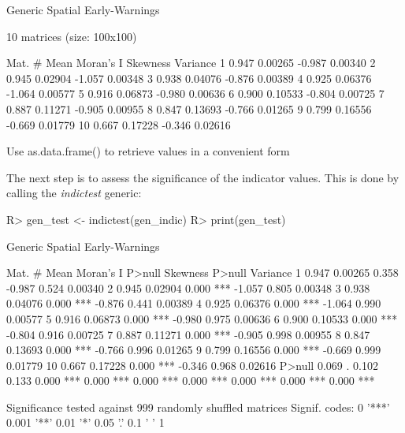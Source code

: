 \documentclass{article}
\begin{document}
\begin{Schunk}
\begin{Soutput}
Generic Spatial Early-Warnings

 10 matrices (size: 100x100)

 Mat. #  Mean Moran's I Skewness Variance
      1 0.947   0.00265   -0.987  0.00340
      2 0.945   0.02904   -1.057  0.00348
      3 0.938   0.04076   -0.876  0.00389
      4 0.925   0.06376   -1.064  0.00577
      5 0.916   0.06873   -0.980  0.00636
      6 0.900   0.10533   -0.804  0.00725
      7 0.887   0.11271   -0.905  0.00955
      8 0.847   0.13693   -0.766  0.01265
      9 0.799   0.16556   -0.669  0.01779
     10 0.667   0.17228   -0.346  0.02616

Use as.data.frame() to retrieve values in a convenient form
\end{Soutput}
\end{Schunk}

The next step is to assess the significance of the indicator values. This is 
done by calling the \emph{indictest} generic: 
  
\begin{Schunk}
\begin{Sinput}
R>   gen_test <- indictest(gen_indic)
R>   print(gen_test)
\end{Sinput}
\begin{Soutput}
Generic Spatial Early-Warnings

 Mat. #  Mean Moran's I P>null     Skewness P>null     Variance
      1 0.947   0.00265  0.358       -0.987  0.524      0.00340
      2 0.945   0.02904  0.000 ***   -1.057  0.805      0.00348
      3 0.938   0.04076  0.000 ***   -0.876  0.441      0.00389
      4 0.925   0.06376  0.000 ***   -1.064  0.990      0.00577
      5 0.916   0.06873  0.000 ***   -0.980  0.975      0.00636
      6 0.900   0.10533  0.000 ***   -0.804  0.916      0.00725
      7 0.887   0.11271  0.000 ***   -0.905  0.998      0.00955
      8 0.847   0.13693  0.000 ***   -0.766  0.996      0.01265
      9 0.799   0.16556  0.000 ***   -0.669  0.999      0.01779
     10 0.667   0.17228  0.000 ***   -0.346  0.968      0.02616
 P>null    
  0.069 .  
  0.102    
  0.133    
  0.000 ***
  0.000 ***
  0.000 ***
  0.000 ***
  0.000 ***
  0.000 ***
  0.000 ***

 Significance tested against 999 randomly shuffled matrices
 Signif. codes:  0 '***' 0.001 '**' 0.01 '*' 0.05 '.' 0.1 ' ' 1 
\end{Soutput}
\end{Schunk}
\end{document}

